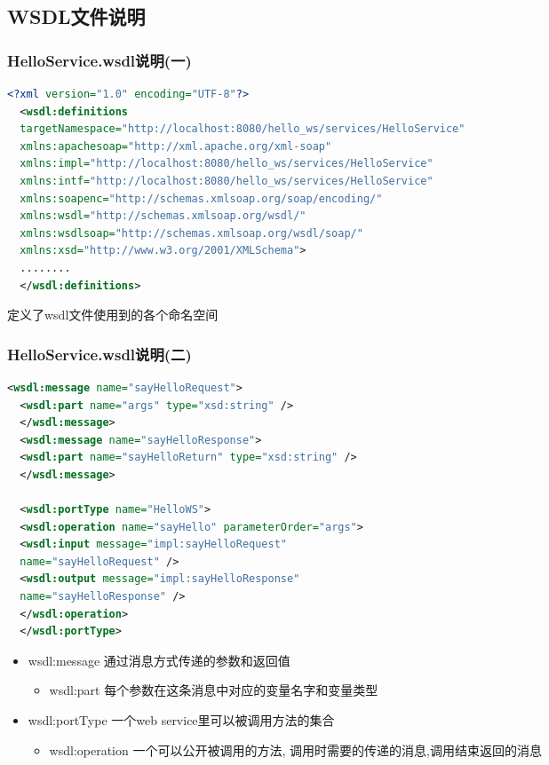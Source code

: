 \documentclass[CJKutf8,compress,hyperref]{beamer}
\begin{document}
\begin{CJK}{UTF8}{song}
  \subsection{WSDL文件说明}
  \begin{frame}[containsverbatim] 
  \frametitle{HelloService.wsdl说明(一)} 
  \begin{lstlisting}[language=XML]
  <?xml version="1.0" encoding="UTF-8"?>
  <wsdl:definitions
  targetNamespace="http://localhost:8080/hello_ws/services/HelloService"
  xmlns:apachesoap="http://xml.apache.org/xml-soap"
  xmlns:impl="http://localhost:8080/hello_ws/services/HelloService"
  xmlns:intf="http://localhost:8080/hello_ws/services/HelloService"
  xmlns:soapenc="http://schemas.xmlsoap.org/soap/encoding/"
  xmlns:wsdl="http://schemas.xmlsoap.org/wsdl/"
  xmlns:wsdlsoap="http://schemas.xmlsoap.org/wsdl/soap/"
  xmlns:xsd="http://www.w3.org/2001/XMLSchema">
  ........
  </wsdl:definitions>
  \end{lstlisting}
  定义了wsdl文件使用到的各个命名空间
  \end{frame}

  \begin{frame}[containsverbatim] 
  \frametitle{HelloService.wsdl说明(二)} 
  \begin{lstlisting}[language=XML]
  <wsdl:message name="sayHelloRequest">
  <wsdl:part name="args" type="xsd:string" />
  </wsdl:message>
  <wsdl:message name="sayHelloResponse">
  <wsdl:part name="sayHelloReturn" type="xsd:string" />
  </wsdl:message>

  <wsdl:portType name="HelloWS">
  <wsdl:operation name="sayHello" parameterOrder="args">
  <wsdl:input message="impl:sayHelloRequest"
  name="sayHelloRequest" />
  <wsdl:output message="impl:sayHelloResponse"
  name="sayHelloResponse" />
  </wsdl:operation>
  </wsdl:portType>
  \end{lstlisting}
  \begin{itemize}
          \item  {\color{red}wsdl:message} 通过消息方式传递的参数和返回值  
                  \begin{itemize}
                          \item {\color{red}wsdl:part} 每个参数在这条消息中对应的变量名字和变量类型
                  \end{itemize}
          \item {\color{red}wsdl:portType} 一个web service里可以被调用方法的集合
                  \begin{itemize}
                          \item {\color{red}wsdl:operation} 一个可以公开被调用的方法, 调用时需要的传递的消息,调用结束返回的消息
                  \end{itemize}
  \end{itemize}
  \end{frame}


\end{CJK}
\end{document}
